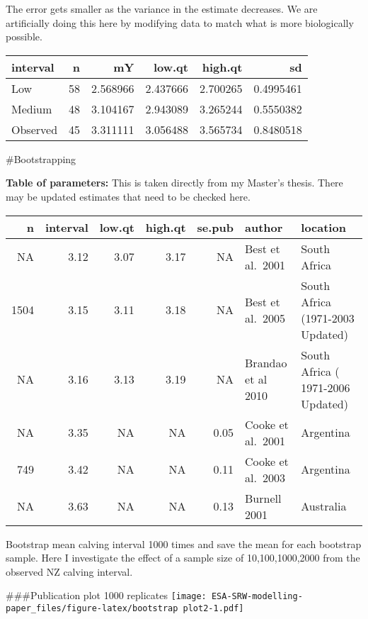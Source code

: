 \documentclass[14pt,]{article}
\begin{document}
The error gets smaller as the variance in the estimate decreases. We are
artificially doing this here by modifying data to match what is more
biologically possible.

\begin{longtable}[]{@{}lrrrrr@{}}
\toprule
interval & n & mY & low.qt & high.qt & sd\tabularnewline
\midrule
\endhead
Low & 58 & 2.568966 & 2.437666 & 2.700265 & 0.4995461\tabularnewline
Medium & 48 & 3.104167 & 2.943089 & 3.265244 & 0.5550382\tabularnewline
Observed & 45 & 3.311111 & 3.056488 & 3.565734 &
0.8480518\tabularnewline
\bottomrule
\end{longtable}

\#Bootstrapping

\textbf{Table of parameters:} This is taken directly from my Master's
thesis. There may be updated estimates that need to be checked here.

\begin{longtable}[]{@{}rrrrrll@{}}
\toprule
n & interval & low.qt & high.qt & se.pub & author &
location\tabularnewline
\midrule
\endhead
NA & 3.12 & 3.07 & 3.17 & NA & Best et al.~2001 & South
Africa\tabularnewline
1504 & 3.15 & 3.11 & 3.18 & NA & Best et al.~2005 & South Africa
(1971-2003 Updated)\tabularnewline
NA & 3.16 & 3.13 & 3.19 & NA & Brandao et al 2010 & South Africa (
1971-2006 Updated)\tabularnewline
NA & 3.35 & NA & NA & 0.05 & Cooke et al.~2001 &
Argentina\tabularnewline
749 & 3.42 & NA & NA & 0.11 & Cooke et al.~2003 &
Argentina\tabularnewline
NA & 3.63 & NA & NA & 0.13 & Burnell 2001 & Australia\tabularnewline
\bottomrule
\end{longtable}

Bootstrap mean calving interval 1000 times and save the mean for each
bootstrap sample. Here I investigate the effect of a sample size of
10,100,1000,2000 from the observed NZ calving interval.

\#\#\#Publication plot 1000 replicates
\texttt{[image: ESA-SRW-modelling-paper\_files/figure-latex/bootstrap plot2-1.pdf]}
\end{document}
